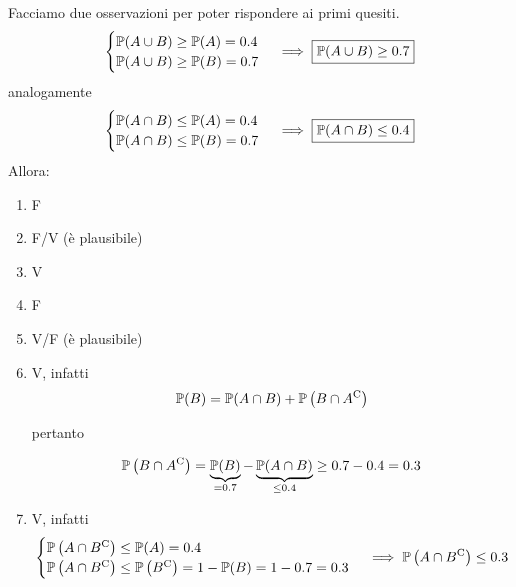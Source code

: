 Facciamo due osservazioni per poter rispondere ai primi quesiti.
\begin{equation*}
\begin{cases}
\mathbb{P}( A\cup B) \geq \mathbb{P}( A) =0.4\\
\mathbb{P}( A\cup B) \geq \mathbb{P}( B) =0.7
\end{cases} \implies  \boxed{\mathbb{P}( A\cup B) \geq 0.7}
\end{equation*}
analogamente
\begin{equation*}
\begin{cases}
\mathbb{P}( A\cap B) \leq \mathbb{P}( A) =0.4\\
\mathbb{P}( A\cap B) \leq \mathbb{P}( B) =0.7
\end{cases} \implies  \boxed{\mathbb{P}( A\cap B) \leq 0.4}
\end{equation*}
Allora:
\begin{enumerate}
\item F
\item F/V (è plausibile)
\item V
\item F
\item V/F (è plausibile)
\item V, infatti\begin{equation*}
\mathbb{P}( B) =\mathbb{P}( A\cap B) +\mathbb{P}\left( B\cap A^{\mathrm{C}}\right)
\end{equation*}

pertanto

\begin{equation*}
\mathbb{P}\left( B\cap A^{\mathrm{C}}\right) =\underbrace{\mathbb{P}( B)}_{=0.7} -\underbrace{\mathbb{P}( A\cap B)}_{\leq 0.4} \geq 0.7-0.4=0.3
\end{equation*}
\item V, infatti\begin{equation*}
\begin{cases}
\mathbb{P}\left( A\cap B^{\mathrm{C}}\right) \leq \mathbb{P}( A) =0.4\\
\mathbb{P}\left( A\cap B^{\mathrm{C}}\right) \leq \mathbb{P}\left( B^{\mathrm{C}}\right) =1-\mathbb{P}( B) =1-0.7=0.3
\end{cases}\implies \mathbb{P}\left( A\cap B^{\mathrm{C}}\right) \leq 0.3
\end{equation*}
\end{enumerate}
\Soluzione
